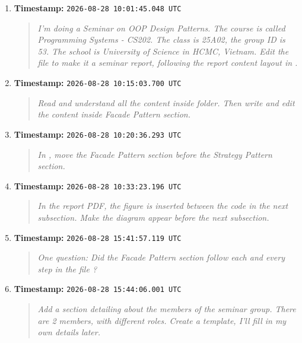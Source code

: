\documentclass[11pt,a4paper]{report}
\begin{document}
\begin{enumerate}
  \item \textbf{Timestamp:} \verb|2026-08-28 10:01:45.048 UTC|
  \begin{quote}\itshape
  I'm doing a Seminar on OOP Design Patterns. The course is called Programming
  Systems \mbox{-} CS202. The class is 25A02, the group ID is 53. The school is
  University of Science in HCMC, Vietnam. Edit the  file to make
  it a seminar report, following the report content layout in
  .
  \end{quote}

  \item \textbf{Timestamp:} \verb|2026-08-28 10:15:03.700 UTC|
  \begin{quote}\itshape
  Read and understand all the content inside  folder. Then
  write and edit the content inside \textquotedbl{}Facade Pattern\textquotedbl{}
  section.
  \end{quote}

  \item \textbf{Timestamp:} \verb|2026-08-28 10:20:36.293 UTC|
  \begin{quote}\itshape
  In , move the Facade Pattern section before the Strategy Pattern
  section.
  \end{quote}

  \item \textbf{Timestamp:} \verb|2026-08-28 10:33:23.196 UTC|
  \begin{quote}\itshape
  In the report PDF, the figure is inserted between the code in the next
  subsection. Make the diagram appear before the next subsection.
  \end{quote}

  \item \textbf{Timestamp:} \verb|2026-08-28 15:41:57.119 UTC|
  \begin{quote}\itshape
  One question: Did the \textquotedbl{}Facade Pattern\textquotedbl{} section
  follow each and every step in the file ?
  \end{quote}

  \item \textbf{Timestamp:} \verb|2026-08-28 15:44:06.001 UTC|
  \begin{quote}\itshape
  Add a section detailing about the members of the seminar group. There are 2
  members, with different roles. Create a template, I'll fill in my own details
  later.
  \end{quote}


\end{enumerate}
\end{document}
